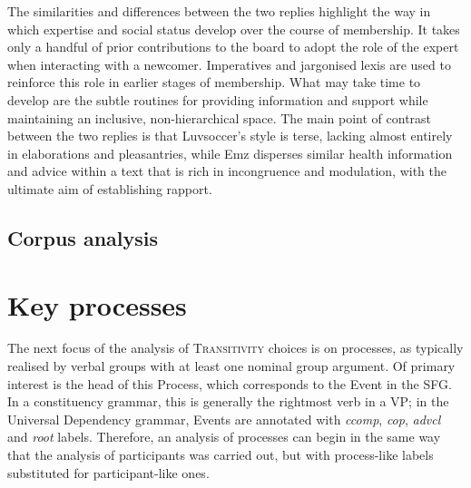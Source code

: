\documentclass{article}
\begin{document}
{%


The similarities and differences between the two replies highlight the way in which expertise and social status develop over the course of membership. It takes only a handful of prior contributions to the board to adopt the role of the expert when interacting with a newcomer. Imperatives and jargonised lexis are used to reinforce this role in earlier stages of membership. What may take time to develop are the subtle routines for providing information and support while maintaining an inclusive, non-hierarchical space. The main point of contrast between the two replies is that Luvsoccer's style is terse, lacking almost entirely in elaborations and pleasantries, while Emz disperses similar health information and advice within a text that is rich in incongruence and modulation, with the ultimate aim of establishing rapport. %

\subsection{Corpus analysis}


\section{Key processes} 

The next focus of the analysis of \textsc{Transitivity} choices is on processes, as typically realised by verbal groups with at least one nominal group argument. Of primary interest is the head of this Process, which corresponds to the Event in the SFG. In a constituency grammar, this is generally the rightmost verb in a VP; in the Universal Dependency grammar, Events are annotated with \emph{ccomp}, \emph{cop}, \emph{advcl} and \emph{root} labels. Therefore, an analysis of processes can begin in the same way that the analysis of participants was carried out, but with process-like labels substituted for participant-like ones.

}
\end{document}
